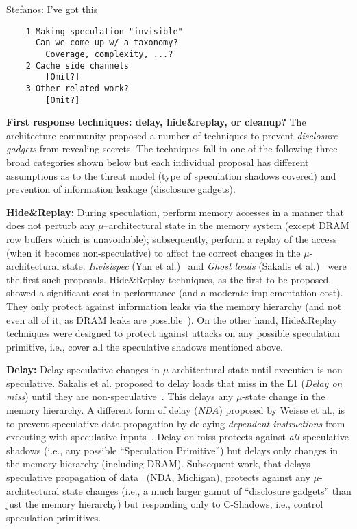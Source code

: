 {\color{red} Stefanos: I've got this}
\begin{verbatim}
    1 Making speculation "invisible"
      Can we come up w/ a taxonomy?
        Coverage, complexity, ...?
    2 Cache side channels 
        [Omit?]
    3 Other related work?
        [Omit?]
\end{verbatim}

\noindent \textbf{First response techniques: delay, hide\&replay, or cleanup?}
The architecture community proposed a number of techniques to prevent \emph{disclosure gadgets} from revealing secrets. The techniques fall in one of the following three broad categories shown below but each individual proposal has different assumptions as to the threat model (type of speculation shadows covered) and prevention of information leakage (disclosure gadgets).
\squishlist
\item{\textbf{Hide\&Replay:}} During speculation, perform memory accesses in a manner that does not perturb any $\mu$--architectural state in the memory system (except DRAM row buffers which is unavoidable); subsequently, perform a replay of the access (when it becomes non-speculative) to affect the correct changes in the $\mu$-architectural state. \emph{Invisispec} (Yan et al.)~\cite{yan_invisispec:MICRO2018} and \emph{Ghost loads} (Sakalis et al.)~\cite{sakalis2019ghost} were the first such proposals. 
Hide\&Replay techniques, as the first to be proposed, showed a significant cost in performance (and a moderate implementation cost). They only protect against information leaks via the memory hierarchy (and not even all of it, as DRAM leaks are possible~\cite{pessl2016drama}). On the other hand, Hide\&Replay techniques were designed to protect against attacks on any possible speculation primitive, i.e., cover all the speculative shadows mentioned above. 
\item{\textbf{Delay:}} Delay speculative changes in $\mu$-architectural state until execution is non-speculative. Sakalis et al. proposed to delay loads that miss in the L1 (\emph{Delay on miss}) until they are non-speculative~\cite{sakalis2019efficient}. This delays any $\mu$-state change in the memory hierarchy. A different form of delay (\emph{NDA}) proposed by Weisse et al., is to prevent speculative data propagation by delaying \emph{dependent instructions} from executing with speculative inputs~\cite{weisse2019nda}. Delay-on-miss protects against \emph{all} speculative shadows (i.e., any possible ``Speculation Primitive'') but delays only changes in the memory hierarchy (including DRAM). Subsequent work, that delays speculative propagation of data~\cite{weisse2019nda} (NDA, Michigan), protects against any $\mu$-architectural state changes (i.e., a much larger gamut of ``disclosure gadgets'' than just the memory hierarchy) but responding only to C-Shadows, i.e., control speculation primitives.
